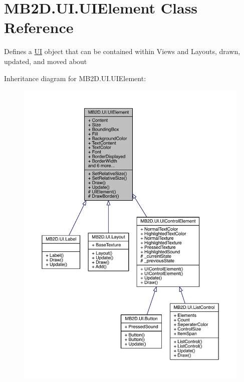 \hypertarget{class_m_b2_d_1_1_u_i_1_1_u_i_element}{}\section{M\+B2\+D.\+U\+I.\+U\+I\+Element Class Reference}
\label{class_m_b2_d_1_1_u_i_1_1_u_i_element}


Defines a \hyperlink{namespace_m_b2_d_1_1_u_i}{UI} object that can be contained within Views and Layouts, drawn, updated, and moved about  




Inheritance diagram for M\+B2\+D.\+U\+I.\+U\+I\+Element\+:\nopagebreak
\begin{figure}[H]
\begin{center}
\leavevmode
\includegraphics[width=350pt]{class_m_b2_d_1_1_u_i_1_1_u_i_element__inherit__graph}
\end{center}
\end{figure}


